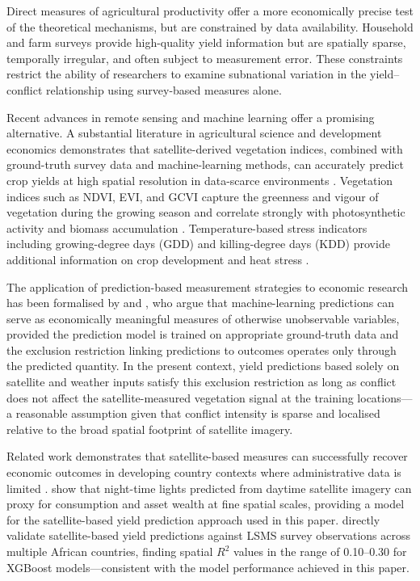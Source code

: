 Direct measures of agricultural productivity offer a more economically precise test of the theoretical mechanisms, but are constrained by data availability. Household and farm surveys provide high-quality yield information but are spatially sparse, temporally irregular, and often subject to measurement error. These constraints restrict the ability of researchers to examine subnational variation in the yield--conflict relationship using survey-based measures alone.

Recent advances in remote sensing and machine learning offer a promising alternative. A substantial literature in agricultural science and development economics demonstrates that satellite-derived vegetation indices, combined with ground-truth survey data and machine-learning methods, can accurately predict crop yields at high spatial resolution in data-scarce environments \citep{BurkeLobell2017, LobellEtal2015, YehEtal2020}. Vegetation indices such as NDVI, EVI, and GCVI capture the greenness and vigour of vegetation during the growing season and correlate strongly with photosynthetic activity and biomass accumulation \citep{BurkeLobell2017}. Temperature-based stress indicators including growing-degree days (GDD) and killing-degree days (KDD) provide additional information on crop development and heat stress \citep{Schlenker_Roberts2009}.

The application of prediction-based measurement strategies to economic research has been formalised by \citet{MullainathanSpiess2017} and \citet{AtheyImbens2019}, who argue that machine-learning predictions can serve as economically meaningful measures of otherwise unobservable variables, provided the prediction model is trained on appropriate ground-truth data and the exclusion restriction linking predictions to outcomes operates only through the predicted quantity. In the present context, yield predictions based solely on satellite and weather inputs satisfy this exclusion restriction as long as conflict does not affect the satellite-measured vegetation signal at the training locations---a reasonable assumption given that conflict intensity is sparse and localised relative to the broad spatial footprint of satellite imagery.

Related work demonstrates that satellite-based measures can successfully recover economic outcomes in developing country contexts where administrative data is limited \citep{JeanEtal2016, BluMenStockEtal2015}. \citet{JeanEtal2016} show that night-time lights predicted from daytime satellite imagery can proxy for consumption and asset wealth at fine spatial scales, providing a model for the satellite-based yield prediction approach used in this paper. \citet{BurkeLobell2017} directly validate satellite-based yield predictions against LSMS survey observations across multiple African countries, finding spatial $R^2$ values in the range of 0.10--0.30 for XGBoost models---consistent with the model performance achieved in this paper.


